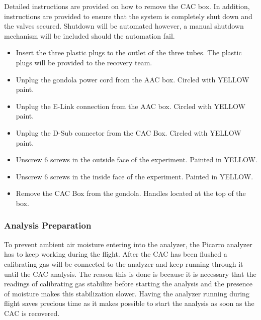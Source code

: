 \documentclass[a4paper,12pt,twoside]{article}
\begin{document}
Detailed instructions are provided on how to remove the CAC box. In addition, instructions are provided to ensure that the system is completely shut down and the valves secured. Shutdown will be automated however, a manual shutdown mechanism will be included should the automation fail.

\label{sec:recovery-checklist}

\begin{itemize}
    \item Insert the three plastic plugs to the outlet of the three tubes. The plastic plugs will be provided to the recovery team. 
    \item Unplug the gondola power cord from the AAC box. Circled with YELLOW paint.
    \item Unplug the E-Link connection from the AAC box. Circled with YELLOW paint.
    \item Unplug the D-Sub connector from the CAC Box. Circled with YELLOW paint.
    \item Unscrew 6 screws in the outside face of the experiment. Painted in YELLOW.
    \item Unscrew 6 screws in the inside face of the experiment. Painted in YELLOW.
    \item Remove the CAC Box from the gondola. Handles located at the top of the box. 
\end{itemize}



\subsubsection{Analysis Preparation}

To prevent ambient air moisture entering into the analyzer, the Picarro analyzer has to keep working during the flight. After the CAC has been flushed a calibrating gas will be connected to the analyzer and keep running through it until the CAC analysis. 
The reason this is done is because it is necessary that the readings of calibrating gas stabilize before starting the analysis and the presence of moisture makes this stabilization slower. Having the analyzer running during flight saves precious time as it makes possible to start the analysis as soon as the CAC is recovered. 
\end{document}
